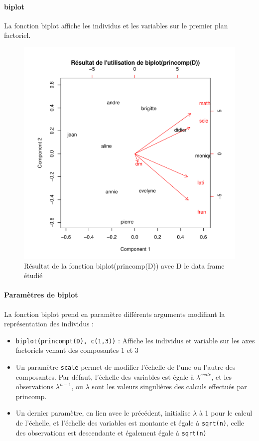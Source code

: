 \documentclass{report}
\begin{document}
\paragraph{biplot}
La fonction biplot affiche les individus et les variables sur le premier plan factoriel.
\begin{figure}[h!]
\begin{center}
    \includegraphics[width=\textwidth]{biplot1.pdf}
    \caption{Résultat de la fonction biplot(princomp(D)) avec D le data frame étudié}
\end{center}
\end{figure}
\paragraph{Paramètres de biplot}
La fonction biplot prend en paramètre différents arguments modifiant la représentation des individus :
\begin{itemize}
\item \verb+biplot(princompt(D), c(1,3))+ : Affiche les individus et variable sur les axes factoriels venant des composantes 1 et 3
\item Un paramètre \verb+scale+ permet de modifier l'échelle de l'une ou l'autre des composantes. Par défaut, l'échelle des variables est égale à $\lambda^{scale}$, et les observations $\lambda^{n-1}$, ou $\lambda$ sont les valeurs singulières des calculs effectués par princomp.
\item Un dernier paramètre, en lien avec le précédent, initialise $\lambda$ à 1 pour le calcul de l'échelle, et l'échelle des variables est montante et égale à \verb+sqrt(n)+, celle des observations est descendante et également égale à \verb+sqrt(n)+
\end{itemize}
\end{document}
